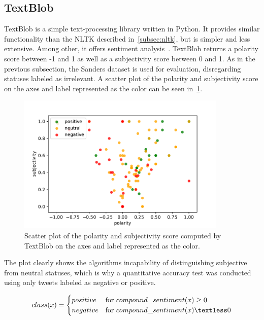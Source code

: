 \subsection{TextBlob}
\label{subsec:textblob}

TextBlob is a simple text-processing library written in Python.
It provides similar functionality than the NLTK described in~\ref{subsec:nltk},
but is simpler and less extensive.
Among other, it offers sentiment analysis~\cite{textblobDocs}.
TextBlob returns a polarity score between -1 and 1 as well as a subjectivity score between 0 and 1.
As in the previous subsection, the Sanders dataset is used for evaluation, disregarding statuses labeled as irrelevant.
A scatter plot of the polarity and subjectivity score on the axes and label represented as the color can be seen in~\ref{fig:textblob}.

\begin{figure}
    \centering
    \caption{Scatter plot of the polarity and subjectivity score computed by TextBlob on the axes and label represented as the color.}
    \label{fig:textblob}
    \includegraphics[width=10cm]{../figures/textblob.pdf}
\end{figure}

The plot clearly shows the algorithms incapability of distinguishing subjective from neutral statuses,
which is why a quantitative accuracy test was conducted using only tweets labeled as negative or positive.

\begin{equation}
   class(x) =
   \begin{cases}
     positive & \text{for } compound\_sentiment(x) \geq 0 \\
     negative & \text{for } compound\_sentiment(x) \textless 0\\
   \end{cases}
\end{equation}

